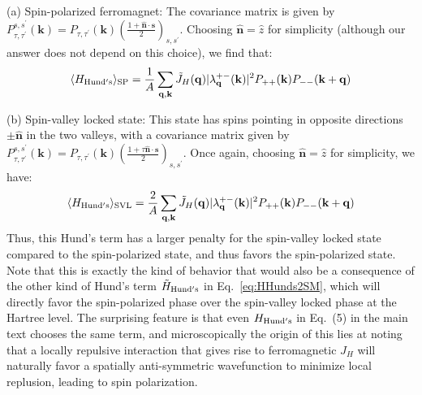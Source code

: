 \documentclass[aps,pra,twocolumn,superscriptaddress,10pt,article,nofootinbib,showpacs,longbibliography]{revtex4-1}
\def \k{{\mathbf k}}
\def \n{{\mathbf n}}
\def \q{{\mathbf q}}
\def \s{{\mathbf s}}
\def \beq{\begin{eqnarray}}
\def \eeq{\end{eqnarray}}
\begin{document}
(a) Spin-polarized ferromagnet: The covariance matrix is given by $P^{s,s^\prime}_{\tau,\tau^\prime}(\k) = P_{\tau,\tau^\prime}(\k) \left( \frac{1 + \hat{\n} \cdot \s}{2} \right)_{s,s^\prime}$. Choosing $\hat{\n} = \hat{z}$ for simplicity (although our answer does not depend on this choice), we find that:
\beq
\langle H_{\rm Hund's} \rangle_{\rm SP} = \frac{1}{A} \sum_{\q,\k} \tilde{J}_H(\q) |\lambda^{+-}_{\q}(\k)|^2 P_{++}(\k) P_{--}(\k + \q)
\eeq

(b) Spin-valley locked state: This state has spins pointing in opposite directions $\pm \hat{\n}$ in the two valleys, with a covariance matrix given by $P^{s,s^\prime}_{\tau,\tau^\prime}(\k) = P_{\tau,\tau^\prime}(\k) \left( \frac{1 + \tau \hat{\n} \cdot \s}{2} \right)_{s,s^\prime}$. 
Once again, choosing $\hat{\n} = \hat{z}$ for simplicity, we have:
\beq
\langle H_{\rm Hund's} \rangle_{\rm SVL} = \frac{2}{A} \sum_{\q,\k} \tilde{J}_H(\q) |\lambda^{+-}_{\q}(\k)|^2 P_{++}(\k) P_{--}(\k + \q)
\eeq
Thus, this Hund's term has a larger penalty for the spin-valley locked state compared to the spin-polarized state, and thus favors the spin-polarized state. Note that this is exactly the kind of behavior that would also be a consequence of the other kind of Hund's term $\tilde{H}_{\rm Hund's}$ in Eq.~\eqref{eq:HHunds2SM}, which will directly favor the spin-polarized phase over the spin-valley locked phase at the Hartree level. The surprising feature is that even $H_{\rm Hund's}$ in Eq.~(5) in the main text chooses the same term, and microscopically the origin of this lies at noting that a locally repulsive interaction that gives rise to ferromagnetic $J_H$ will naturally favor a spatially anti-symmetric wavefunction to minimize local replusion, leading to spin polarization.
\end{document}
